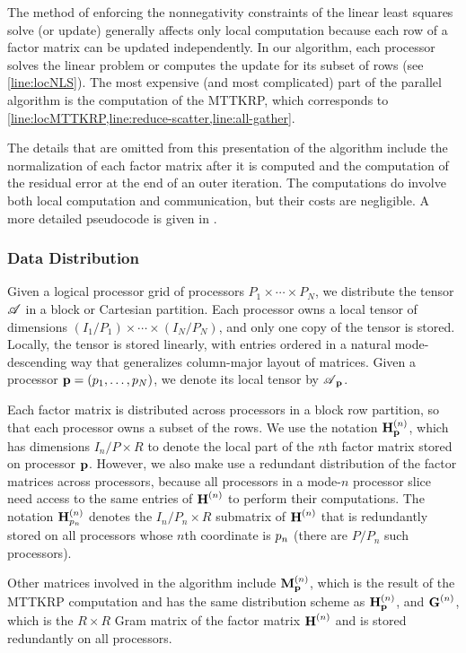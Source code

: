 The method of enforcing the nonnegativity constraints of the linear least squares solve (or update) generally affects only local computation because each row of a factor matrix can be updated independently.
In our algorithm, each processor solves the linear problem or computes the update for its subset of rows (see \cref{line:locNLS}). 
The most expensive (and most complicated) part of the parallel algorithm is the computation of the MTTKRP, which corresponds to \cref{line:locMTTKRP,line:reduce-scatter,line:all-gather}.

The details that are omitted from this presentation of the algorithm include the normalization of each factor matrix after it is computed and the computation of the residual error at the end of an outer iteration.
The computations do involve both local computation and communication, but their costs are negligible.
A more detailed pseudocode is given in .

\subsubsection{Data Distribution}
\label{sec:datadist}

Given a logical processor grid of processors $P_1\times \cdots \times P_N$, we distribute the tensor $\TA$ in a block or Cartesian partition.
Each processor owns a local tensor of dimensions $(I_1/P_1)\times \cdots \times (I_N/P_N)$, and only one copy of the tensor is stored.
Locally, the tensor is stored linearly, with entries ordered in a natural mode-descending way that generalizes column-major layout of matrices.
Given a processor $\V{p}=(\VE{p}{1},\dots,\VE{p}{N})$, we denote its local tensor by $\TA_{\V{p}}$.

Each factor matrix is distributed across processors in a block row partition, so that each processor owns a subset of the rows.
We use the notation $\Mn{H}{n}_{\V{p}}$, which has dimensions $I_n/P\times R$ to denote the local part of the $n$th factor matrix stored on processor $\V{p}$.
However, we also make use a redundant distribution of the factor matrices across processors, because all processors in a mode-$n$ processor slice need access to the same entries of $\Mn{H}{n}$ to perform their computations.
The notation $\Mn{H}{n}_{\VE{p}{n}}$ denotes the $I_n/P_n\times R$ submatrix of $\Mn{H}{n}$ that is redundantly stored on all processors whose $n$th coordinate is $\VE{p}{n}$ (there are $P/P_n$ such processors).

Other matrices involved in the algorithm include $\Mn{M}{n}_{\V{p}}$, which is the result of the MTTKRP computation and has the same distribution scheme as $\Mn{H}{n}_{\V{p}}$, and $\Mn{G}{n}$, which is the $R\times R$ Gram matrix of the factor matrix $\Mn{H}{n}$ and is stored redundantly on all processors.

